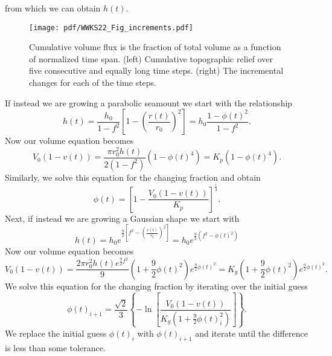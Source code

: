 from which we can obtain $h(t)$.
\begin{figure}[h]
\centering
\texttt{[image: pdf/WWKS22\_Fig\_increments.pdf]}
\caption{Cumulative volume flux is the fraction of total volume as a function of normalized time span.
(left) Cumulative topographic relief over five consecutive and equally long time steps. (right) The incremental
changes for each of the time steps.}
\label{WWKS22_Fig_increments}
\end{figure}
If instead we are growing a parabolic seamount we start with the relationship
\begin{equation*}
h(t) = \frac{h_0}{1-f^2} \left [1 - \left (\frac{r(t)}{r_0} \right )^2 \right ] = h_0 \frac{1 - \phi(t)^2}{1 - f^2}.
\end{equation*}
Now our volume equation becomes
\begin{equation*}
V_0 (1 - v(t)) = \frac{\pi r_0^2 h(t)}{2 (1-f^2)} (1 - \phi(t)^4) = K_p (1 - \phi(t)^4).
\end{equation*}
Similarly, we solve this equation for the changing fraction and obtain
\begin{equation*}
\phi(t) = \left [1 - \frac{V_0 (1 - v(t))}{K_p} \right ]^{\frac{1}{4}}.
\end{equation*}
Next, if instead we are growing a Gaussian shape we start with
\begin{equation*}
h(t) = h_0 e^{\frac{9}{2} \left [ f^2 - \left (\frac{r(t)}{r_0} \right )^2 \right ]} = h_0 e^{\frac{9}{2}\left(f^2 - \phi(t)^2\right)}
\end{equation*}
Now our volume equation becomes
\begin{equation*}
V_0 (1 - v(t)) = \frac{2\pi r_0^2 h(t)e^{\frac{9}{2}f^2}}{9} \left (1 + \frac{9}{2}\phi(t)^2\right ) e^{\frac{9}{2}\phi(t)^2} = K_g (1 + \frac{9}{2}\phi(t)^2) e^{\frac{9}{2}\phi(t)^2}.
\end{equation*}
We solve this equation for the changing fraction by iterating over the initial guess
\begin{equation*}
\phi(t)_{i+1} = \frac{\sqrt{2}}{3} \left \{ - \ln \left [\frac{V_0 (1 - v(t))}{K_g \left (1 + \frac{9}{2}\phi(t)^2_i \right )} \right ] \right \}.
\end{equation*}
We replace the initial guess $\phi(t)_i$ with $\phi(t)_{i+1}$ and iterate until the difference
is less than some tolerance.

